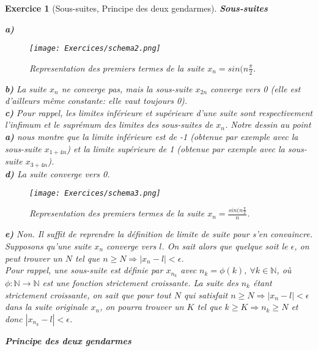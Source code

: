 \documentclass{article}
\newcommand{\Nn}{{\mathbb{N}}}
\theoremstyle{exercice}
\newtheorem{exercice}{Exercice}
\begin{document}
\begin{exercice}[Sous-suites, Principe des deux gendarmes]
    
\textbf{Sous-suites}

\textbf{a)} \\

\begin{figure}[H]
    \centering
    \texttt{[image: Exercices/schema2.png]}
    \caption{Representation des premiers termes de la suite $x_n=sin(n\frac{\pi}{2}$.}
    \label{fig:enter-label}
\end{figure}

\textbf{b)} La suite $x_n$ ne converge pas, mais la sous-suite $x_{2n}$ converge vers 0 (elle est d'ailleurs même constante: elle vaut toujours 0).\\

\textbf{c)} Pour rappel, les limites inférieure et supérieure d'une suite sont respectivement l'infimum et le suprémum des limites des sous-suites de $x_n$. Notre dessin au point \textbf{a)} nous montre que la limite inférieure est de -1 (obtenue par exemple avec la sous-suite $x_{1+4n}$) et la limite supérieure de 1 (obtenue par exemple avec la sous-suite $x_{3+4n}$). \\

\textbf{d)} La suite converge vers 0. \\


\begin{figure}[H]
    \centering
    \texttt{[image: Exercices/schema3.png]}
    \caption{Representation des premiers termes de la suite $x_n=\frac{sin(n\frac{\pi}{2}}{n}$.}
    \label{fig:enter-label}
\end{figure}

\textbf{e)} Non. Il suffit de reprendre la définition de limite de suite pour s'en convaincre. Supposons qu'une suite $x_n$ converge vers $l$. On sait alors que quelque soit le $\epsilon$, on peut trouver un $N$ tel que $n \geq N \Rightarrow |x_n - l| < \epsilon$. \\
Pour rappel, une sous-suite est définie par $x_{n_k}$ avec $n_k = \phi(k), \ \forall k \in \Nn$, où $\phi: \Nn \rightarrow \Nn$ est une fonction strictement croissante. La suite des $n_k$ étant strictement croissante, on sait que pour tout $N$ qui satisfait $n \geq N \Rightarrow |x_n - l| < \epsilon$ dans la suite originale $x_n$, on pourra trouver un $K$ tel que $k \geq K \Rightarrow n_k \geq N$ et donc $|x_{n_k} - l| < \epsilon$.

\textbf{Principe des deux gendarmes}\\


\end{exercice}
\end{document}
